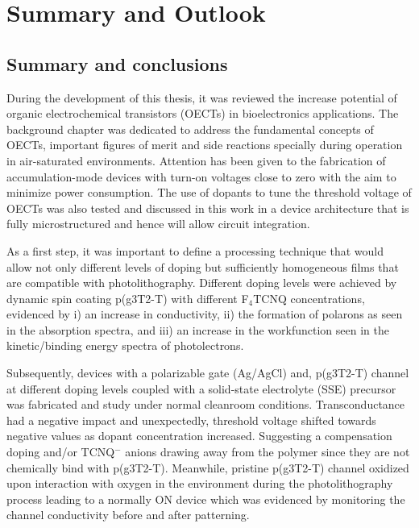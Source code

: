 \chapter{Summary and Outlook}
\label{cha:conclusion}

\section{Summary and conclusions}

During the development of this thesis, it was reviewed the increase potential of organic electrochemical transistors (OECTs) in bioelectronics applications. The background chapter was dedicated to address the fundamental concepts of OECTs, important figures of merit and side reactions specially during operation in air-saturated environments. Attention has been given to the fabrication of accumulation-mode devices with turn-on voltages close to zero with the aim to minimize power consumption. The use of dopants to tune the threshold voltage of OECTs was also tested and discussed in this work in a device architecture that is fully microstructured and hence will allow circuit integration. 

As a first step, it was important to define a processing technique that would allow not only different levels of doping but sufficiently homogeneous films that are compatible with photolithography. Different doping levels were achieved by dynamic spin coating p(g3T2-T) with different F$_{4}$TCNQ concentrations, evidenced by i) an increase in conductivity, ii) the formation of polarons as seen in the absorption spectra, and iii) an increase in the workfunction seen in the kinetic/binding energy spectra of photolectrons.

Subsequently, devices with a polarizable gate (Ag/AgCl) and, p(g3T2-T) channel at different doping levels coupled with a solid-state electrolyte (SSE) precursor was fabricated and study under normal cleanroom conditions. Transconductance had a negative impact and unexpectedly, threshold voltage shifted towards negative values as dopant concentration increased. Suggesting a compensation doping and/or TCNQ$^{-}$ anions drawing away from the polymer since they are not chemically bind with p(g3T2-T). Meanwhile, pristine p(g3T2-T) channel oxidized upon interaction with oxygen in the environment during the photolithography process leading to a normally ON device which was evidenced by monitoring the channel conductivity before and after patterning.

